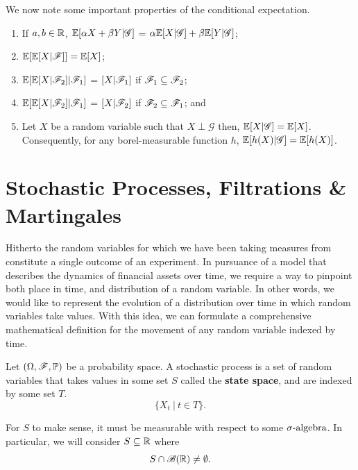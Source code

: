 \documentclass[../TGMAFFIRO.tex]{subfiles}
\begin{document}
We now note some important properties of the conditional expectation.
\begin{proposition}
	\begin{enumerate}
		\item If $a, b \in \mathbb{R}$, $\mathbb{E}[\alpha X + \beta Y | \mathscr{G}]$ = $\alpha \mathbb{E}[X | \mathscr{G}] + \beta\mathbb{E}[Y | \mathscr{G}]$;
		\item $\mathbb{E}[\mathbb{E}[X | \mathscr{F}]] = \mathbb{E}[X]$;
		\item $\mathbb{E}[\mathbb{E}[X | \mathscr{F}_2] | \mathscr{F}_1]$ = $[X | \mathscr{F}_1]$ if $\mathscr{F}_1 \subseteq \mathscr{F}_2$;
		\item $\mathbb{E}[\mathbb{E}[X | \mathscr{F}_2] | \mathscr{F}_1]$ = $[X | \mathscr{F}_2]$ if $\mathscr{F}_2 \subseteq \mathscr{F}_1$; and
		\item Let $X$ be a random variable such that $X \perp \mathscr{G}$ then, $\mathbb{E}[X|\mathscr{G}] = \mathbb{E}[X]$. Consequently, for any borel-measurable function $h$, $\mathbb{E}[h(X)|\mathscr{G}] = \mathbb{E}[h(X)]$.
	\end{enumerate}
\end{proposition}


\section{Stochastic Processes, Filtrations \& Martingales}
Hitherto the random variables for which we have been taking measures from constitute a single outcome of an experiment. In pursuance of a model that describes the dynamics of financial assets over time, we require a way to pinpoint both place in time, and distribution of a random variable. In other words, we would like to represent the evolution of a distribution over time in which random variables take values. With this idea, we can formulate a comprehensive mathematical definition for the movement of any random variable indexed by time.

\begin{definition}
	Let $(\Omega, \mathscr{F}, \mathbb{P})$ be a probability space. A stochastic process is a set of random variables that takes values in some set $S$ called the \textbf{state space}, and are indexed by some set $T$.
	\begin{equation}
		\{X_t \ | \ t \in T\}.
	\end{equation}
\end{definition}

For $S$ to make sense, it must be measurable with respect to some $\sigma\text{-algebra}$. In particular, we will consider $S \subseteq \mathbb{R}$ where
\[
	S \cap \mathscr{B}(\mathbb{R}) \neq \emptyset.
\]
\end{document}
